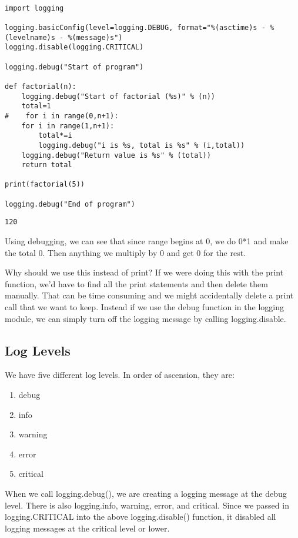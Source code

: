\documentclass[11pt]{article}
\begin{document}
\begin{verbatim}

import logging

logging.basicConfig(level=logging.DEBUG, format="%(asctime)s - %(levelname)s - %(message)s")
logging.disable(logging.CRITICAL)

logging.debug("Start of program")

def factorial(n):
    logging.debug("Start of factorial (%s)" % (n))
    total=1
#    for i in range(0,n+1):
    for i in range(1,n+1):
        total*=i
        logging.debug("i is %s, total is %s" % (i,total))
    logging.debug("Return value is %s" % (total))
    return total

print(factorial(5))

logging.debug("End of program")

\end{verbatim}

\begin{verbatim}
120
\end{verbatim}


Using debugging, we can see that since range begins at 0, we do 0*1 and make the total 0. Then anything we multiply by 0 and get 0 for the rest.

Why should we use this instead of print? If we were doing this with the print function, we'd have to find all the print statements and then delete them manually. That can be time consuming and we might accidentally delete a print call that we want to keep. Instead if we use the debug function in the logging module, we can simply turn off the logging message by calling logging.disable.

\subsection{Log Levels}
\label{sec:org5319db8}

We have five different log levels. In order of ascension, they are:

\begin{enumerate}
\item debug
\item info
\item warning
\item error
\item critical
\end{enumerate}

When we call logging.debug(), we are creating a logging message at the debug level. There is also logging.info, warning, error, and critical. Since we passed in logging.CRITICAL into the above logging.disable() function, it disabled all logging messages at the critical level or lower.
\end{document}
